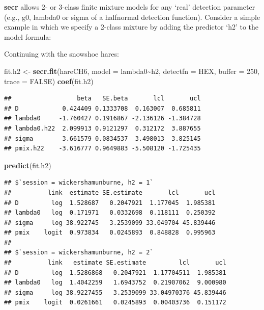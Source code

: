 \documentclass[
]{book}
\newenvironment{Shaded}{\begin{snugshade}}{\end{snugshade}}
\newcommand{\AttributeTok}[1]{\textcolor[rgb]{0.13,0.29,0.53}{#1}}
\newcommand{\ConstantTok}[1]{\textcolor[rgb]{0.56,0.35,0.01}{#1}}
\newcommand{\DecValTok}[1]{\textcolor[rgb]{0.00,0.00,0.81}{#1}}
\newcommand{\FunctionTok}[1]{\textcolor[rgb]{0.13,0.29,0.53}{\textbf{#1}}}
\newcommand{\NormalTok}[1]{#1}
\newcommand{\OtherTok}[1]{\textcolor[rgb]{0.56,0.35,0.01}{#1}}
\newcommand{\SpecialCharTok}[1]{\textcolor[rgb]{0.81,0.36,0.00}{\textbf{#1}}}
\newcommand{\StringTok}[1]{\textcolor[rgb]{0.31,0.60,0.02}{#1}}
\begin{document}

\textbf{secr} allows 2- or 3-class finite mixture models for any `real' detection parameter (e.g., g0, lambda0 or sigma of a halfnormal detection function). Consider a simple example in which we specify a 2-class mixture by adding the predictor `h2' to the model formula:

Continuing with the snowshoe hares:

\begin{Shaded}
\begin{Highlighting}[]
\NormalTok{fit.h2 }\OtherTok{\textless{}{-}} \FunctionTok{secr.fit}\NormalTok{(hareCH6, }\AttributeTok{model =}\NormalTok{ lambda0}\SpecialCharTok{\textasciitilde{}}\NormalTok{h2,}
                   \AttributeTok{detectfn =} \StringTok{\textquotesingle{}HEX\textquotesingle{}}\NormalTok{, }\AttributeTok{buffer =} \DecValTok{250}\NormalTok{, }\AttributeTok{trace =} \ConstantTok{FALSE}\NormalTok{)}
\FunctionTok{coef}\NormalTok{(fit.h2)}
\end{Highlighting}
\end{Shaded}

\begin{verbatim}
##                  beta   SE.beta       lcl       ucl
## D            0.424409 0.1333708  0.163007  0.685811
## lambda0     -1.760427 0.1916867 -2.136126 -1.384728
## lambda0.h22  2.099913 0.9121297  0.312172  3.887655
## sigma        3.661579 0.0834537  3.498013  3.825145
## pmix.h22    -3.616777 0.9649883 -5.508120 -1.725435
\end{verbatim}

\begin{Shaded}
\begin{Highlighting}[]
\FunctionTok{predict}\NormalTok{(fit.h2)}
\end{Highlighting}
\end{Shaded}

\begin{verbatim}
## $`session = wickershamunburne, h2 = 1`
##          link  estimate SE.estimate       lcl       ucl
## D         log  1.528687   0.2047921  1.177045  1.985381
## lambda0   log  0.171971   0.0332698  0.118111  0.250392
## sigma     log 38.922745   3.2539099 33.049704 45.839446
## pmix    logit  0.973834   0.0245893  0.848828  0.995963
## 
## $`session = wickershamunburne, h2 = 2`
##          link   estimate SE.estimate         lcl       ucl
## D         log  1.5286868   0.2047921  1.17704511  1.985381
## lambda0   log  1.4042259   1.6943752  0.21907062  9.000980
## sigma     log 38.9227455   3.2539099 33.04970376 45.839446
## pmix    logit  0.0261661   0.0245893  0.00403736  0.151172
\end{verbatim}
\end{document}
